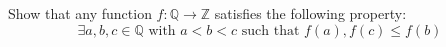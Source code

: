 \begin{problem}
    Show that any function \( f:\mathbb{Q}\longrightarrow\mathbb{Z} \) satisfies the following property:
    \[
        \exists a,b,c\in\mathbb{Q}\text{ with } a<b<c \text{ such that } f\left(a\right), f\left(c\right)\leq f\left(b\right)
    \]
\end{problem}
